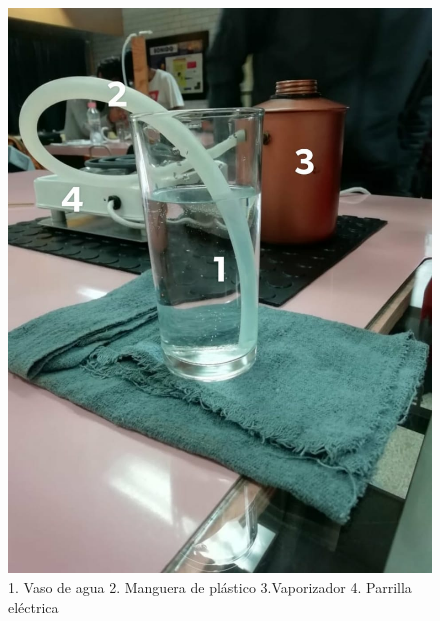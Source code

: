 \documentclass[10pt,a4paper]{article}
\begin{document}
\begin{figure}[H]
\includegraphics[scale=0.15]{1.jpeg}
\centering
\caption{1. Vaso de agua 2. Manguera de plástico 3.Vaporizador 4. Parrilla eléctrica}
\end{figure}
\end{document}
